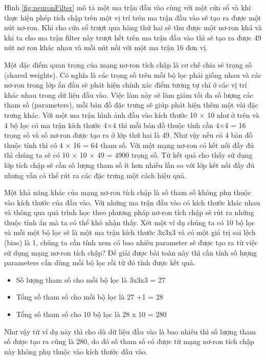 \documentclass[a4paper]{article}
\begin{document}
Hình \ref{fig:neuronFilter} mô tả một ma trận đầu vào cùng với một cửa sổ và khi thực hiện phép tích chập trên một vị trí trên ma trận đầu vào sẽ tạo ra được một nút nơ-ron. Khi cho cửa sổ trượt qua hàng thứ hai sẽ thu được một nơ-ron khá và khi ta cho ma trận
filter này trượt hết trên ma trận đầu vào thì sẽ tạo ra được 49 nút nơ ron khác nhau và mỗi nút nối với một ma trận 16 đơn vị.

Một đặc điểm quan trọng của mạng nơ-ron tích chập là cơ chế chia sẻ trọng số (shared weights). Có nghĩa là các trọng số trên mỗi bộ lọc phải giống nhau và các nơ-ron trong lớp ẩn đầu sẽ phát hiện chính xác điểm tương tự chỉ ở các vị trí khác
nhau trong dữ liệu đầu vào. Việc làm này sẽ làm giảm tối đa số lượng các tham số (parameters), mỗi bản đồ đặc trưng sẽ giúp phát hiện thêm một vài đặc trưng khác. Với một ma trận hình ảnh đầu vào kích thước 10 × 10 như ở trên và 4 bộ lọc có ma trận kích thước 4×4 thì mỗi bản đồ thuộc tính cần 4×4 = 16 trọng số và số nơ-ron được tạo ra ở lớp thứ hai là 49. Như vậy nếu có 4 bản đồ thuộc tính thì có 4 × 16 = 64 tham số. Với một mạng nơ-ron có kết nối đầy đủ thì chúng ta sẽ có 10 × 10 × 49 = 4900 trọng số. Từ kết quả cho thấy sử dụng lớp tích chập sẽ cần số lượng tham số ít hơn nhiều lần so với lớp kết nối đầy đủ nhưng vẫn có thể rút ra các đặc trưng
một cách hiệu quả.

Một khả năng khác của mạng nơ-ron tích chập là số tham số không phụ thuộc vào kích thước của đầu vào. Với những ma trận đầu vào có kích thước khác nhau và thông qua quá trình học theo phương pháp nơ-ron tích chập sẽ rút ra những thuộc tính ẩn mà ta có thể khó nhận thấy. Xét một ví dụ chúng ta có 10 bộ lọc và mỗi một bộ lọc sẽ là một ma trận kích thước 3x3x3 và có một giá trị sai lệch (bias) là 1, chúng ta cần tính xem có bao nhiêu parameter sẽ được tạo ra từ việc sử dụng mạng nơ-ron tích chập? Để giải được bài toàn này thì cần tính số lượng parameters cần dùng mỗi bộ lọc rồi từ đó tính được kết quả.

\begin{itemize}
    \item Số lượng tham số cho mỗi bộ lọc là 3x3x3 = 27
    \item Tổng số tham số cho mỗi bộ lọc là 27 +1 = 28
    \item Tổng số tham số cho 10 bộ lọc là 28 x 10 = 280
\end{itemize}

Như vậy từ ví dụ này thì cho dù dữ liệu đầu vào là bao nhiêu thì số lượng tham số được tạo ra cũng là 280, do đó số tham số có được từ mạng nơ-ron tích chập này không phụ thuộc vào kích thước đầu vào.
\end{document}
